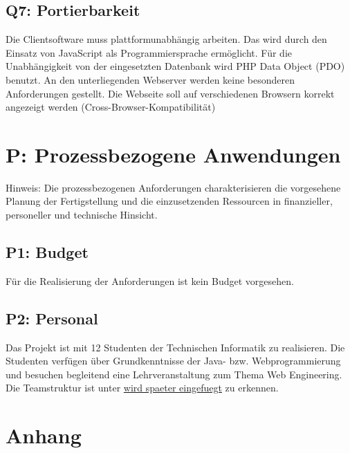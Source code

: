 \documentclass[10pt,a4paper]{scrartcl}
\begin{document}
\subsection{Q7: Portierbarkeit}
Die Clientsoftware muss plattformunabhängig arbeiten. Das wird durch den Einsatz von JavaScript als Programmiersprache ermöglicht. Für die Unabhängigkeit von der eingesetzten Datenbank wird PHP Data Object (PDO) benutzt. An den unterliegenden Webserver werden keine besonderen Anforderungen gestellt. Die Webseite soll auf verschiedenen Browsern korrekt angezeigt werden (Cross-Browser-Kompatibilität)


\section{P: Prozessbezogene Anwendungen}
Hinweis: Die prozessbezogenen Anforderungen charakterisieren die vorgesehene Planung der Fertigstellung und die einzusetzenden Ressourcen in finanzieller, personeller und technische Hinsicht.

\subsection{P1: Budget}
Für die Realisierung der Anforderungen ist kein Budget vorgesehen.


\subsection{P2: Personal}
Das Projekt ist mit 12 Studenten der Technischen Informatik zu realisieren. Die Studenten verfügen über Grundkenntnisse der Java- bzw. Webprogrammierung und besuchen begleitend eine Lehrveranstaltung zum Thema Web Engineering. Die Teamstruktur ist unter \url{
wird spaeter eingefuegt} zu erkennen.

\newpage
\section{Anhang}
\end{document}
